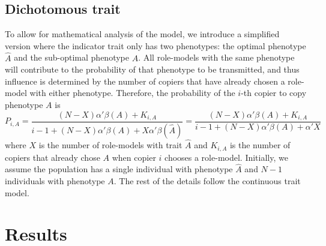 \documentclass[12pt]{extarticle}
\begin{document}
\subsection*{Dichotomous trait}
To allow for mathematical analysis of the model, we introduce a simplified version where the indicator trait only has two phenotypes: the optimal phenotype $\hat{A}$ and the sub-optimal phenotype $A$. 
All role-models with the same phenotype will contribute to the probability of that phenotype to be transmitted, and thus influence is determined by the number of copiers that have already chosen a role-model with either phenotype.
Therefore, the probability of the $i$-th copier to copy phenotype $A$ is
\begin{equation}\label{eq:binary-model}
P_{i,A} = \frac{(N-X)\alpha'\beta(A) + K_{i,A}}{i-1 + (N-X)\alpha'\beta(A) + X\alpha'\beta(\hat{A})} = \frac{(N-X)\alpha'\beta(A) + K_{i,A}}{i-1 + (N-X)\alpha'\beta(A) + \alpha'X} %
\end{equation}
where $X$ is the number of role-models with trait $\hat{A}$ and $K_{i,A}$ is the number of copiers that already chose $A$ when copier $i$ chooses a role-model.
Initially, we assume the population has a single individual with phenotype $\hat{A}$ and $N-1$ individuals with phenotype $A$. The rest of the details follow the continuous trait model.

\section*{Results}
\end{document}
